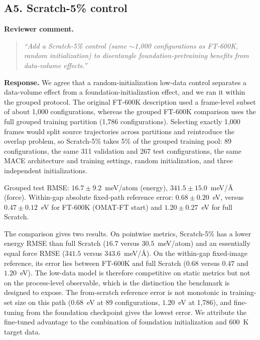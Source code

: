 \documentclass[11pt,a4paper]{article}
\begin{document}
\subsection*{A5. Scratch-5\% control}

\noindent\textbf{Reviewer comment.}
\begin{quote}
\itshape
``Add a Scratch-5\% control (same $\sim$1,000 configurations as FT-600K, random initialization) to disentangle foundation-pretraining benefits from data-volume effects.''
\end{quote}

\noindent\textbf{Response.}
We agree that a random-initialization low-data control separates a data-volume effect from a foundation-initialization effect, and we ran it within the grouped protocol. The original FT-600K description used a frame-level subset of about 1,000 configurations, whereas the grouped FT-600K comparison uses the full grouped training partition (1,786 configurations). Selecting exactly 1,000 frames would split source trajectories across partitions and reintroduce the overlap problem, so Scratch-5\% takes 5\% of the grouped training pool: 89 configurations, the same 311 validation and 267 test configurations, the same MACE architecture and training settings, random initialization, and three independent initializations.

\begin{center}
Grouped test RMSE: $16.7 \pm 9.2$~meV/atom (energy), $341.5 \pm 15.0$~meV/\AA{} (force). Within-gap absolute fixed-path reference error: $0.68 \pm 0.20$~eV, versus $0.47 \pm 0.12$~eV for FT-600K (OMAT-FT start) and $1.20 \pm 0.27$~eV for full Scratch.
\end{center}

The comparison gives two results. On pointwise metrics, Scratch-5\% has a lower energy RMSE than full Scratch ($16.7$ versus $30.5$~meV/atom) and an essentially equal force RMSE ($341.5$ versus $343.6$~meV/\AA{}). On the within-gap fixed-image reference, its error lies between FT-600K and full Scratch ($0.68$ versus $0.47$ and $1.20$~eV). The low-data model is therefore competitive on static metrics but not on the process-level observable, which is the distinction the benchmark is designed to expose. The from-scratch reference error is not monotonic in training-set size on this path ($0.68$~eV at 89 configurations, $1.20$~eV at 1,786), and fine-tuning from the foundation checkpoint gives the lowest error. We attribute the fine-tuned advantage to the combination of foundation initialization and 600~K target data.
\end{document}
